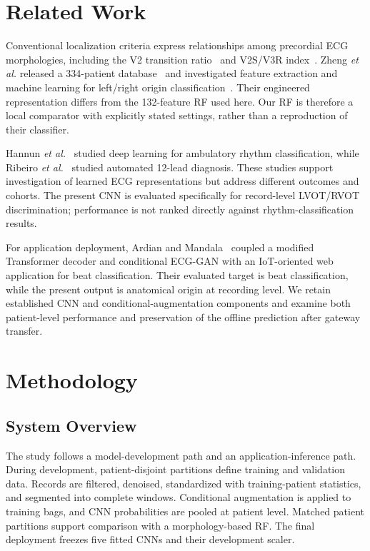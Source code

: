 \documentclass[conference,a4paper]{IEEEtran}
\begin{document}
\section{Related Work}
Conventional localization criteria express relationships among precordial ECG morphologies, including the V2 transition ratio~\cite{betensky2011} and V2S/V3R index~\cite{yoshida2014}. Zheng \emph{et al.} released a 334-patient database~\cite{zheng2020} and investigated feature extraction and machine learning for left/right origin classification~\cite{zheng2021}. Their engineered representation differs from the 132-feature RF used here. Our RF is therefore a local comparator with explicitly stated settings, rather than a reproduction of their classifier.

Hannun \emph{et al.}~\cite{hannun2019} studied deep learning for ambulatory rhythm classification, while Ribeiro \emph{et al.}~\cite{ribeiro2020} studied automated 12-lead diagnosis. These studies support investigation of learned ECG representations but address different outcomes and cohorts. The present CNN is evaluated specifically for record-level LVOT/RVOT discrimination; performance is not ranked directly against rhythm-classification results.

For application deployment, Ardian and Mandala~\cite{ardian2025} coupled a modified Transformer decoder and conditional ECG-GAN with an IoT-oriented web application for beat classification. Their evaluated target is beat classification, while the present output is anatomical origin at recording level. We retain established CNN and conditional-augmentation components and examine both patient-level performance and preservation of the offline prediction after gateway transfer.

\section{Methodology}
\subsection{System Overview}
The study follows a model-development path and an application-inference path. During development, patient-disjoint partitions define training and validation data. Records are filtered, denoised, standardized with training-patient statistics, and segmented into complete windows. Conditional augmentation is applied to training bags, and CNN probabilities are pooled at patient level. Matched patient partitions support comparison with a morphology-based RF. The final deployment freezes five fitted CNNs and their development scaler.
\end{document}
